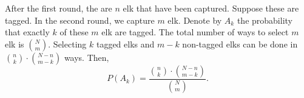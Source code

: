 
\setcounter{theorem}{30}
\begin{exercise}[BH.1.31]
\begin{solution}
	After the first round, the are $n$ elk that have been captured. Suppose these are tagged. In the second round, we capture $m$ elk. Denote by $A_{k}$ the probability that exactly $k$ of these $m$ elk are tagged. The total number of ways to select $m$ elk is ${N \choose m}$. Selecting $k$ tagged elks and $m-k$ non-tagged elks can be done in ${n \choose k}\cdot {N-n \choose m-k}$ ways. Then, $$P(A_k) = \frac{{n \choose k}\cdot {N-n \choose m-k}}{{N \choose m}}.$$
\end{solution}
\end{exercise}


